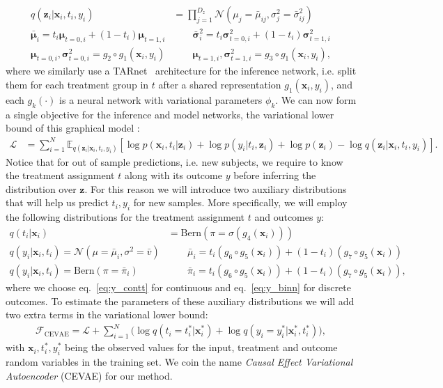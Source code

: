 \documentclass{article}
\DeclareMathOperator{\E}{\mathbb{E}}
\def\!#1{\boldsymbol{#1}}
\def\*#1{\mathbf{#1}}
\def\E{\mathbb{E}}
\begin{document}
\begin{align}
q(\*z_i|\*x_i, t_i, y_i) & = \prod_{j=1}^{D_z}\mathcal{N}(\mu_j=\bar{\mu}_{ij}, \sigma^2_j = \bar{\sigma}_{ij}^2)\\
\bar{\!\mu}_{i} = t_i \!\mu_{t=0, i} + (1 - t_i)\!\mu_{t=1, i}&\qquad
\bar{\!\sigma}^2_i = t_i \!\sigma^2_{t=0, i} + (1 - t_i)\!\sigma^2_{t=1, i}\nonumber\\
\!\mu_{t=0, i},\!\sigma^2_{t=0, i} = g_2\circ g_1(\*x_i, y_i) &\qquad
\!\mu_{t=1,i},\!\sigma^2_{t=1,i} = g_3 \circ g_1(\*x_i, y_i),\nonumber
\end{align}
where we similarly use a TARnet~\citep{shalit2016estimating} architecture for the inference network, i.e. split them for each treatment group in $t$ after a shared representation $g_1(\*x_i, y_i)$, and each $g_k(\cdot)$ is a neural network with variational parameters $\phi_k$. 
We can now form a single objective for the inference and model networks, the variational lower bound of this graphical model \citep{kingma2013auto,rezende2014stochastic}:
\begin{align}
\mathcal{L} & = \sum_{i=1}^{N}\E_{q(\*z_i|\*x_i,t_i,y_i)}[\log p(\*x_i, t_i|\*z_i) + \log p(y_i|t_i, \*z_i) + \log p(\*z_i) - \log q(\*z_i|\*x_i,t_i,y_i)]. \label{eq:lb_full}
\end{align}
Notice that for out of sample predictions, i.e. new subjects, we require to know the treatment assignment $t$ along with its outcome $y$ before inferring the distribution over $\*z$. For this reason we will introduce two auxiliary distributions that will help us predict $t_i,y_i$ for new samples. More specifically, we will employ the following distributions for the treatment assignment $t$ and outcomes $y$: 
\begin{align}
q(t_i | \*x_i) &= \text{Bern}(\pi = \sigma(g_4(\*x_i)))\\
q(y_i|\*x_i,t_i) = \mathcal{N}(\mu=\bar{\mu}_i, \sigma^2=\bar{v}) & \qquad \bar{\mu}_i = t_i (g_6 \circ g_5(\*x_i)) + (1 - t_i)(g_7 \circ g_5(\*x_i))\label{eq:y_contt}\\
q(y_i|\*x_i,t_i) = \text{Bern}(\pi=\bar{\pi}_i) & \qquad\bar{\pi}_i = t_i (g_6\circ g_5(\*x_i)) + (1 - t_i)(g_7 \circ g_5(\*x_i)),\label{eq:y_binn}
\end{align}
where we choose eq.~\ref{eq:y_contt} for continuous and eq.~\ref{eq:y_binn} for discrete outcomes. To estimate the parameters of these auxiliary distributions we will add two extra terms in the variational lower bound:
\begin{align}
\mathcal{F}_{\text{CEVAE}} = \mathcal{L} + \sum_{i=1}^{N}\big(\log q(t_i = t^*_i|\*x^*_i) + \log q(y_i=y^*_i|\*x^*_i, t^*_i)\big),\label{eq:objfn}
\end{align}
with $\*x_i,t^*_i,y^*_i$ being the observed values for the input, treatment and outcome random variables in the training set. We coin the name \emph{Causal Effect Variational Autoencoder} (CEVAE) for our method. 
\end{document}
